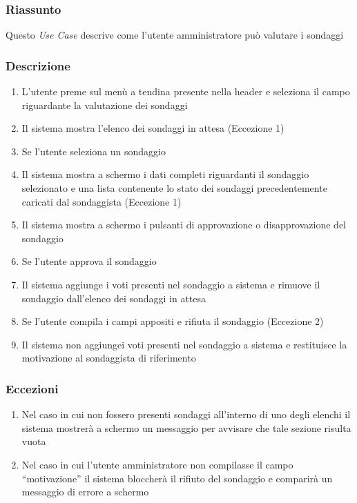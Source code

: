         \subsubsection{Riassunto}
            Questo \textit{Use Case} descrive come l'utente amministratore può valutare i sondaggi 
        \subsubsection{Descrizione}
            \begin{enumerate}
                \item L'utente preme sul menù a tendina presente nella header e seleziona il campo riguardante la valutazione dei sondaggi
                \item Il sistema mostra l'elenco dei sondaggi in attesa (Eccezione 1)
                \item Se l'utente seleziona un sondaggio
                \item Il sistema mostra a schermo i dati completi riguardanti il sondaggio selezionato e una lista contenente lo stato dei sondaggi precedentemente caricati dal sondaggista (Eccezione 1)
                \item Il sistema mostra a schermo i pulsanti di approvazione o disapprovazione del sondaggio
                \item Se l'utente approva il sondaggio
                \item Il sistema aggiunge i voti presenti nel sondaggio a sistema e rimuove il sondaggio dall'elenco dei sondaggi in attesa
                \item Se l'utente compila i campi appositi e rifiuta il sondaggio (Eccezione 2)
                \item Il sistema non aggiungei voti presenti nel sondaggio a sistema e restituisce la motivazione al sondaggista di riferimento
            \end{enumerate}
        \subsubsection{Eccezioni}
            \begin{enumerate}
                \item Nel caso in cui non fossero presenti sondaggi all'interno di uno degli elenchi il sistema mostrerà a schermo un messaggio per avvisare che tale sezione risulta vuota
                \item Nel caso in cui l'utente amministratore non compilasse il campo ``motivazione'' il sistema bloccherà il rifiuto del sondaggio e comparirà un messaggio di errore a schermo
            \end{enumerate}

